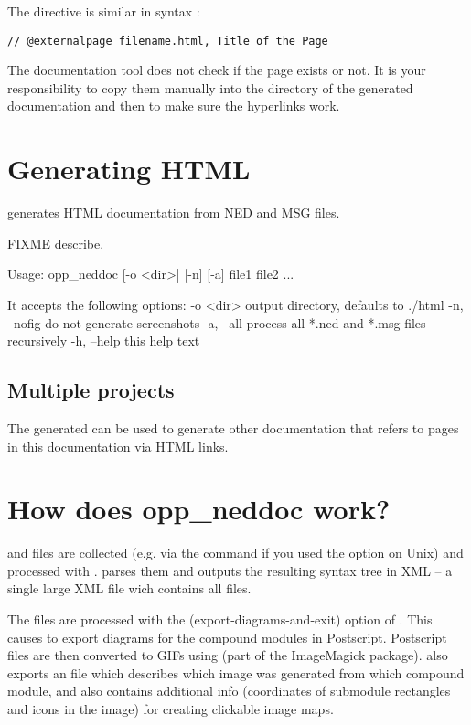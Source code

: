 The  directive is similar in syntax
:

\begin{verbatim}
// @externalpage filename.html, Title of the Page
\end{verbatim}

The documentation tool does not check if the page exists
or not. It is your responsibility to copy them manually into
the directory of the generated documentation and then to make
sure the hyperlinks work.



\section{Generating HTML}

 generates HTML documentation from NED and MSG files.

FIXME describe.

Usage: opp\_neddoc [-o <dir>] [-n] [-a] file1 file2 ...

It accepts the following options:
 -o <dir>      output directory, defaults to ./html
 -n, --nofig   do not generate screenshots
 -a, --all     process all *.ned and *.msg files recursively
 -h, --help    this help text



\subsection{Multiple projects}

The generated  can be used to generate other documentation
that refers to pages in this documentation via HTML links.


\section{How does opp\_neddoc work?}

 and  files are collected (e.g. via the 
command if you used the  option on Unix) and processed
with .  parses them and outputs the resulting syntax
tree in XML -- a single large XML file wich contains all files.

The  files are processed with the  (export-diagrams-and-exit)
option of . This causes  to export diagrams for the
compound modules in Postscript. Postscript files are then converted
to GIFs using  (part of the ImageMagick package).
 also exports an  file which describes which
image was generated from which compound module, and also contains
additional info (coordinates of submodule rectangles and icons in the image)
for creating clickable image maps.

